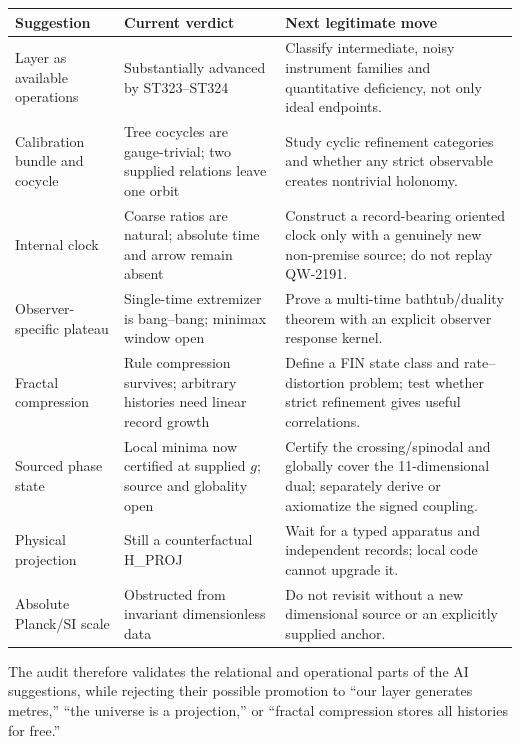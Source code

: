 \documentclass[11pt,a4paper]{article}
\begin{document}
\begin{longtable}{p{}p{}p{}}
\toprule Suggestion&Current verdict&Next legitimate move\\\midrule\endhead
Layer as available operations&Substantially advanced by ST323--ST324&Classify intermediate, noisy instrument families and quantitative deficiency, not only ideal endpoints.\\
Calibration bundle and cocycle&Tree cocycles are gauge-trivial; two supplied relations leave one orbit&Study cyclic refinement categories and whether any strict observable creates nontrivial holonomy.\\
Internal clock&Coarse ratios are natural; absolute time and arrow remain absent&Construct a record-bearing oriented clock only with a genuinely new non-premise source; do not replay QW-2191.\\
Observer-specific plateau&Single-time extremizer is bang--bang; minimax window open&Prove a multi-time bathtub/duality theorem with an explicit observer response kernel.\\
Fractal compression&Rule compression survives; arbitrary histories need linear record growth&Define a FIN state class and rate--distortion problem; test whether strict refinement gives useful correlations.\\
Sourced phase state&Local minima now certified at supplied $g$; source and globality open&Certify the crossing/spinodal and globally cover the 11-dimensional dual; separately derive or axiomatize the signed coupling.\\
Physical projection&Still a counterfactual H\_PROJ&Wait for a typed apparatus and independent records; local code cannot upgrade it.\\
Absolute Planck/SI scale&Obstructed from invariant dimensionless data&Do not revisit without a new dimensional source or an explicitly supplied anchor.\\
\bottomrule
\end{longtable}

The audit therefore validates the relational and operational parts of the AI suggestions,
while rejecting their possible promotion to ``our layer generates metres,'' ``the universe
is a projection,'' or ``fractal compression stores all histories for free.''
\end{document}
